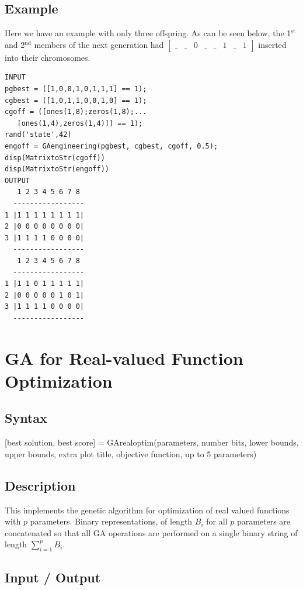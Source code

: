 \documentclass{book}
\newcommand{\textcode}[1]{\textsf{\small #1}}   %
\begin{document}
\subsection*{Example}

Here we have an example with only three offspring. As can be seen below, the
1$^{\text{st}}$ and 2$^{\text{nd}}$ members of the next generation had $%
\begin{bmatrix}
\_ & \_ & 0 & \_ & \_ & 1 & \_ & 1%
\end{bmatrix}%
$ inserted into their chromosomes.
\begin{verbatim}
INPUT
pgbest = ([1,0,0,1,0,1,1,1] == 1);
cgbest = ([1,0,1,1,0,0,1,0] == 1);
cgoff = ([ones(1,8);zeros(1,8);...
   [ones(1,4),zeros(1,4)]] == 1);
rand('state',42)
engoff = GAengineering(pgbest, cgbest, cgoff, 0.5);
disp(MatrixtoStr(cgoff))
disp(MatrixtoStr(engoff))
OUTPUT
   1 2 3 4 5 6 7 8
  -----------------
1 |1 1 1 1 1 1 1 1|
2 |0 0 0 0 0 0 0 0|
3 |1 1 1 1 0 0 0 0|
  -----------------
   1 2 3 4 5 6 7 8
  -----------------
1 |1 1 0 1 1 1 1 1|
2 |0 0 0 0 0 1 0 1|
3 |1 1 1 1 0 0 0 0|
  -----------------
\end{verbatim}

\section{GA for Real-valued Function Optimization}

\subsection*{Syntax}

\textcode{[best solution, best score] = GArealoptim(parameters,
number bits, lower bounds, upper bounds, extra plot title,
objective function, up to 5 parameters)}

\subsection*{Description}

This implements the genetic algorithm for optimization of real valued
functions with $p$ parameters. Binary representations, of length $B_{i}$ for
all $p$ parameters are concatenated so that all GA operations are performed
on a single binary string of length $\sum_{i=1}^{p}B_{i}$.

\subsection*{Input / Output}
\end{document}
